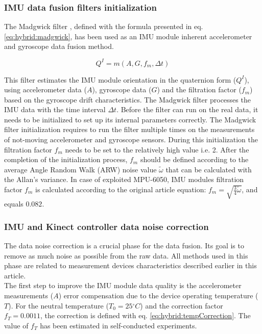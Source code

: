 \documentclass[sensors,article,submit,moreauthors,pdftex,10pt,a4paper]{mdpi}
\newcommand{\degree}{\ensuremath{{}^{\circ}}\xspace}
\begin{document}
	\subsubsection{IMU data fusion filters initialization}
	The Madgwick filter \cite{Madgwick2011}, defined with the formula presented in eq. \ref{eq:hybrid:madgwick}, has been used as an IMU module inherent accelerometer and gyroscope data fusion method. 
		
	\begin{equation}
		Q^I=m(A,G,f_m,\Delta t)
		\label{eq:hybrid:madgwick}
	\end{equation}
		
	This filter estimates the IMU module orientation in the quaternion form ($Q^I$), using accelerometer data ($A$), gyroscope data ($G$) and the filtration factor ($f_m$) based on the gyroscope drift characteristics. The Madgwick filter processes the IMU data with the time interval $\Delta t$. Before the filter can run on the real data, it needs to be initialized to set up its internal parameters correctly. The Madgwick filter initialization requires to run the filter multiple times on the measurements of not-moving accelerometer and gyroscope sensors. During this initialization the filtration factor $f_m$ needs to be set to the relatively high value i.e. 2. After the completion of the initialization process, $f_m$ should be defined according to the average Angle Random Walk (ARW) noise value $\widetilde{\omega}$ that can be calculated with the Allan’s variance\cite{FreescaleSemiconductor2015,Allan1966,Allan1987}. In case of exploited MPU-6050, IMU modules filtration factor $f_m$ is calculated according to the original article \cite{Madgwick2011} equation: $f_m = \sqrt{\frac{3}{4}\widetilde{\omega}}$, and equals $0.082$. 
		
	\subsubsection{IMU and Kinect controller data noise correction}
	The data noise correction is a crucial phase for the data fusion. Its goal is to remove as much noise as possible from the raw data. All methods used in this phase are related to measurement devices characteristics described earlier in this article.\\
	The first step to improve the IMU module data quality is the accelerometer measurements ($A$) error compensation due to the device operating temperature ($T$). For the neutral temperature ($T_0=25\degree C$) and the correction factor $f_T= 0.0011$, the correction is defined with eq. \ref{eq:hybrid:tempCorrection}. The value of $f_T$ has been estimated in self-conducted experiments.
		
\end{document}
